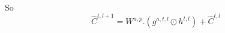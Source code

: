 So 
\begin{equation}
\hat{C}^{t, l+1}= W^{a,p}.(g^{a,t,l} \odot {h}^{t, l} )+  \hat{C}^{t, l}
\end{equation}








